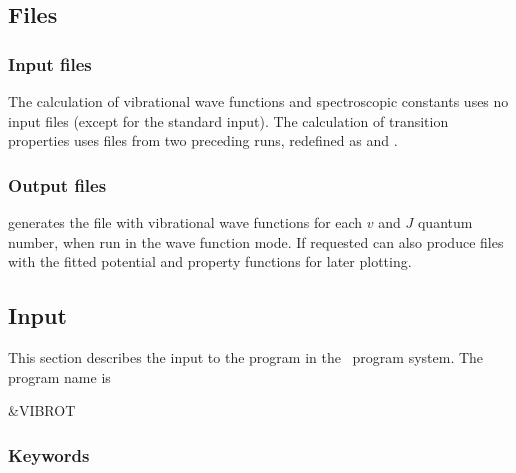 \subsection{Files}
\label{UG:sec:vibrot_files}
\subsubsection{Input files}

The calculation of vibrational wave functions and spectroscopic
constants uses no input files (except for the standard input).
The calculation of transition properties uses
 files from two preceding
 runs, redefined as
 and
.

\subsubsection{Output files}

 generates the file
 with vibrational wave functions for each $v$ and $J$ quantum
number, when run in the wave function mode. If requested  can
also produce files  with the fitted potential and property
functions for later plotting.


\subsection{Input}
\label{UG:sec:vibrot_input}
This section describes the input to the  program in the
\molcas\ program system. The program name is
\begin{inputlisting}
 &VIBROT
\end{inputlisting}

\subsubsection{Keywords}

